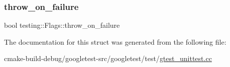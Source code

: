 \mbox{\label{structtesting_1_1Flags_ab8e7d21e31e641efe47b8050759e001a}} 
\subsubsection{\texorpdfstring{throw\_on\_failure}{throw\_on\_failure}}
{\footnotesize\ttfamily bool testing\+::\+Flags\+::throw\+\_\+on\+\_\+failure}



The documentation for this struct was generated from the following file\+:\begin{DoxyCompactItemize}
\item 
cmake-\/build-\/debug/googletest-\/src/googletest/test/\mbox{\hyperlink{gtest__unittest_8cc}{gtest\+\_\+unittest.\+cc}}\end{DoxyCompactItemize}
